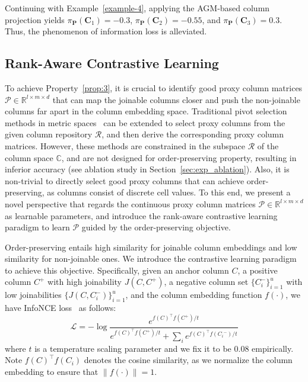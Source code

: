 \begin{example}
\label{example-6}
    Continuing with Example~\ref{example-4}, applying the AGM-based column projection yields  $\pi_{\mathbf{P}}(\mathbf{C}_1) = -0.3$, $\pi_{\mathbf{P}}(\mathbf{C}_2) = -0.55$, and $\pi_{\mathbf{P}}(\mathbf{C}_3) = 0.3$. Thus, the phenomenon of information loss is alleviated.
\end{example}


\subsection{Rank-Aware Contrastive Learning}
\label{subsubsec:PivotLearn}
To achieve Property~\ref{prop:3}, it is crucial to identify good proxy column matrices $\mathcal{P} \in \mathbb{R}^{l \times m \times d }$ that can map the joinable columns closer and push the non-joinable columns far apart in the column embedding space. Traditional pivot selection methods in metric spaces~\cite{ZhuCGJ22} can be extended to select proxy columns from the given column repository $\mathcal{R}$, and then derive the corresponding proxy column matrices. However, these methods are constrained in the subspace $\mathcal{R}$ of the column space  $\mathbb{C}$, and are not designed for order-preserving property, resulting in inferior accuracy (see ablation study in Section~\ref{sec:exp_ablation}). Also, it is non-trivial to directly select good proxy columns that can achieve order-preserving, as columns consist of discrete cell values. To this end, we present a novel perspective that regards the continuous proxy column matrices $\mathcal{P} \in \mathbb{R}^{l \times m \times d }$ as learnable parameters, and introduce the rank-aware contrastive learning paradigm 
to learn $\mathcal{P}$
guided by the order-preserving objective.



Order-preserving entails high similarity for joinable column embeddings and low similarity for non-joinable ones. We introduce the contrastive learning paradigm to achieve this objective. Specifically, given an anchor column $C$, a positive column $ C^{+}$ with high joinability $J(C, C^+)$,  a negative column set $\{C_i^-\}_{i=1}^u$ with low joinabilities $\{J(C, C_i^-)\}_{i=1}^u$, and the column embedding function $f(\cdot)$, we have InfoNCE loss~\cite{Moco} as follows:
\begin{equation}
\label{eq:cl}
\mathcal{L} =-\log \frac{e^{  f(C)^{\top} f(C^+)/ t}}{ e^{ f(C)^{\top} f({C}^+)/ t} + {\sum_i e^{  f({C})^{\top} f({C_i}^-)/ t}}}
\end{equation}
\noindent
where $t$ is a  temperature scaling parameter and we fix it to be 0.08 empirically. Note $ f(C)^{\top} f(C_i)$ denotes the  cosine similarity, as we normalize the column embedding to ensure that $\| f(\cdot) \| = 1$.  

